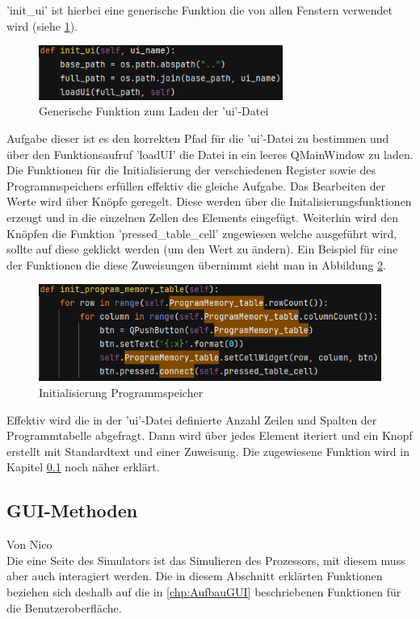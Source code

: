 \documentclass[12pt]{article}
\newcommand{\imgSpaceBefore}{\vspace{10pt}}
\begin{document}
\noindent
'init\_ui' ist hierbei eine generische Funktion die von allen Fenstern verwendet wird (siehe \ref{fig:InitUI}).\imgSpaceBefore

\begin{figure}[H]
\centering
\includegraphics[width=8cm]{bilder/initUI}
\caption{Generische Funktion zum Laden der 'ui'-Datei}
\label{fig:InitUI}
\end{figure}

\noindent
Aufgabe dieser ist es den korrekten Pfad für die 'ui'-Datei zu bestimmen und über den Funktionsaufruf 'loadUI' die Datei in ein leeres QMainWindow zu laden. Die Funktionen für die Initialisierung der verschiedenen Register sowie des Programmspeichers erfüllen effektiv die gleiche Aufgabe. Das Bearbeiten der Werte wird über Knöpfe geregelt. Diese werden über die Initalisierungsfunktionen erzeugt und in die einzelnen Zellen des Elements eingefügt. Weiterhin wird den Knöpfen die Funktion 'pressed\_table\_cell' zugewiesen welche ausgeführt wird, sollte auf diese geklickt werden (um den Wert zu ändern). Ein Beispiel für eine der Funktionen die diese Zuweisungen übernimmt sieht man in Abbildung \ref{fig:InitProgMem}.\imgSpaceBefore

\begin{figure}[H]
\centering
\includegraphics[width=12cm]{bilder/initProgMem}
\caption{Initialisierung Programmspeicher}
\label{fig:InitProgMem}
\end{figure}

\noindent
Effektiv wird die in der 'ui'-Datei definierte Anzahl Zeilen und Spalten der Programmtabelle abgefragt. Dann wird über jedes Element iteriert und ein Knopf erstellt mit Standardtext und einer Zuweisung. Die zugewiesene Funktion wird in Kapitel \ref{chapter:GUI-Methods} noch näher erklärt.


\subsection{GUI-Methoden}\label{chapter:GUI-Methods}
Von Nico\\
\noindent
Die eine Seite des Simulators ist das Simulieren des Prozessors, mit diesem muss aber auch interagiert werden. Die in diesem Abschnitt erklärten Funktionen beziehen sich deshalb auf die in \ref{chp:AufbauGUI} beschriebenen Funktionen für die Benutzeroberfläche.
\end{document}
